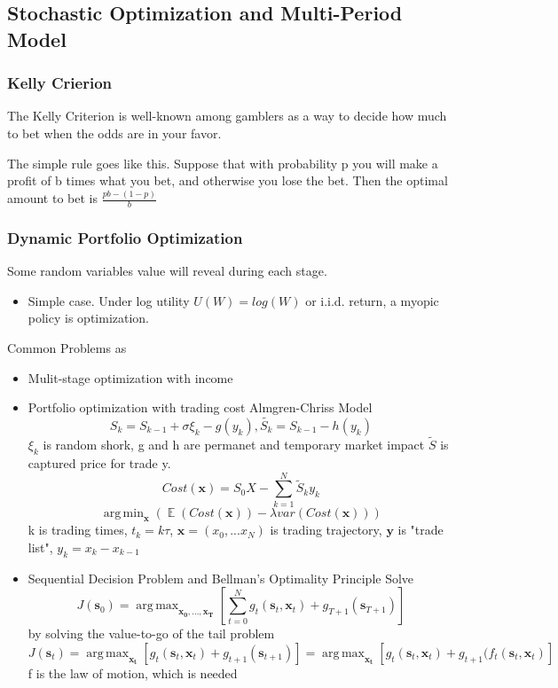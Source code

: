 \documentclass[11pt, openany]{book}              %
\DeclareMathOperator*{\argmax}{arg\,max}  %
\DeclareMathOperator*{\argmin}{arg\,min}  %
\DeclareMathOperator{\E}{\mathbb{E}}
\begin{document}
\subsection{Stochastic Optimization and Multi-Period Model}

\subsubsection{Kelly Crierion}

The Kelly Criterion is well-known among gamblers as a way to decide how much to bet when the odds are in your favor. 

The simple rule goes like this. Suppose that with probability p you will make a profit of b times what you bet, and otherwise you lose the bet. Then the optimal amount to bet is $\frac{pb−(1−p)}{b}$

\subsubsection{Dynamic Portfolio Optimization}

Some random variables value will reveal during each stage. 

\begin{itemize}
	\item Simple case. Under log utility $U(W) = log(W)$ or i.i.d. return, a myopic policy is optimization. 
\end{itemize}

Common Problems as
\begin{itemize}
	\item Mulit-stage optimization with income
	\item Portfolio optimization with trading cost
	\subitem Almgren-Chriss Model
	$$ S_k = S_{k-1} + \sigma \xi_k - g(y_k), \tilde{S_k} = S_{k-1} - h(y_k)$$
	$\xi_k$ is random shork, g and h are permanet and temporary market impact $\tilde{S}$ is captured price for trade y.
	$$Cost(\mathbf{x}) = S_0 X - \sum_{k=1}^N \tilde{S}_k y_k$$
	$$ \argmin_{\mathbf{x}} (\E(Cost(\mathbf{x}))- \lambda var( Cost(\mathbf{x})))$$
	k is trading times, $t_k = k \tau$, $\mathbf{x} = (x_0,...x_N)$ is trading trajectory, $\mathbf{y}$ is "trade list", $y_k = x_k - x_{k-1}$
	\item Sequential Decision Problem and Bellman's Optimality Principle
	\subitem Solve 
	$$ J(\mathbf{s}_0) = \argmax _{\mathbf{x_0},...,\mathbf{x_T}}[ \sum_{t=0}^N g_t(\mathbf{s}_t, \mathbf{x}_t) + g_{T+1}(\mathbf{s}_{T+1})]$$
	by solving the value-to-go of the tail problem
	$$ J(\mathbf{s}_t) = \argmax _{\mathbf{x_t}}[ g_t(\mathbf{s}_t, \mathbf{x}_t) + g_{t+1}(\mathbf{s}_{t+1})]= \argmax _{\mathbf{x_t}}[ g_t(\mathbf{s}_t, \mathbf{x}_t) + g_{t+1}(f_t(\mathbf{s}_t, \mathbf{x}_t)] $$
	f is the law of motion, which is needed
\end{itemize}
\end{document}
